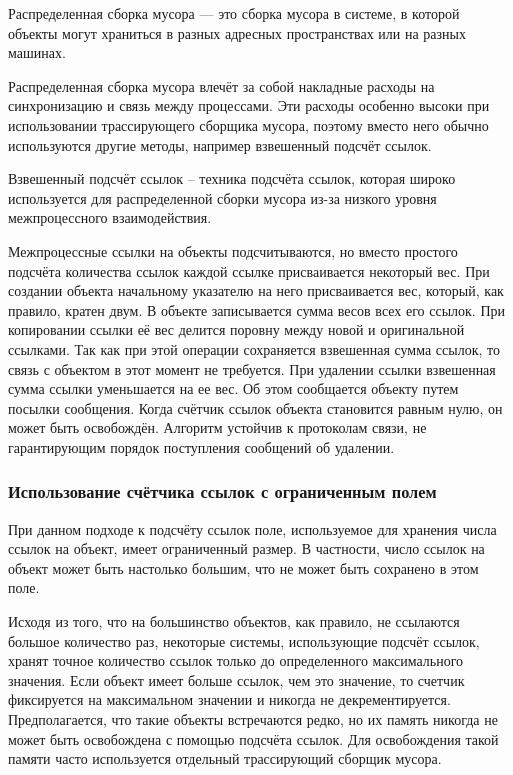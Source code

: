 Распределенная сборка мусора \cite{glossary} --- это сборка мусора в системе, в которой объекты могут храниться в разных адресных пространствах или на разных машинах. 

Распределенная сборка мусора влечёт за собой накладные расходы на синхронизацию и связь между процессами. Эти расходы особенно высоки при использовании трассирующего сборщика мусора, поэтому вместо него обычно используются другие методы, например взвешенный подсчёт ссылок. \cite{glossary}

Взвешенный подсчёт ссылок \cite{glossary} -- техника подсчёта ссылок, которая широко используется для распределенной сборки мусора из-за низкого уровня межпроцессного взаимодействия.

Межпроцессные ссылки на объекты подсчитываются, но вместо простого подсчёта количества ссылок каждой ссылке присваивается некоторый вес. При создании объекта начальному указателю на него присваивается вес, который, как правило, кратен двум. В объекте записывается сумма весов всех его ссылок. При копировании ссылки её вес делится поровну между новой и оригинальной ссылками. Так как при этой операции сохраняется взвешенная сумма ссылок, то связь с объектом в этот момент не требуется. При удалении ссылки взвешенная сумма ссылки уменьшается на ее вес. Об этом сообщается объекту путем посылки сообщения. Когда счётчик ссылок объекта становится равным нулю, он может быть освобождён. Алгоритм устойчив к протоколам связи, не гарантирующим порядок поступления сообщений об удалении. \cite{glossary}

\clearpage
\subsubsection[Использование счётчика ссылок \\с ограниченным полем]{Использование счётчика ссылок с ограниченным полем}

При данном подходе к подсчёту ссылок поле, используемое для хранения числа ссылок на объект, имеет ограниченный размер. В частности, число ссылок на объект может быть настолько большим, что не может быть сохранено в этом поле. \cite{glossary}

Исходя из того, что на большинство объектов, как правило, не ссылаются большое количество раз, некоторые системы, использующие подсчёт ссылок, хранят точное количество ссылок только до определенного максимального значения. Если объект имеет больше ссылок, чем это значение, то счетчик фиксируется на максимальном значении и никогда не декрементируется. Предполагается, что такие объекты встречаются редко, но их память никогда не может быть освобождена с помощью подсчёта ссылок. Для освобождения такой памяти часто используется отдельный трассирующий сборщик мусора. \cite{glossary}

